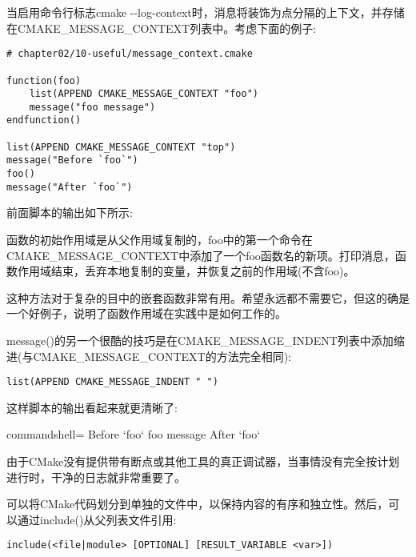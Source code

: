 当启用命令行标志cmake -{}-log-context时，消息将装饰为点分隔的上下文，并存储在CMAKE\_MESSAGE\_CONTEXT列表中。考虑下面的例子:

\begin{lstlisting}[style=styleCMake]
# chapter02/10-useful/message_context.cmake
	
function(foo)
	list(APPEND CMAKE_MESSAGE_CONTEXT "foo")
	message("foo message")
endfunction()

list(APPEND CMAKE_MESSAGE_CONTEXT "top")
message("Before `foo`")
foo()
message("After `foo`")
\end{lstlisting}

前面脚本的输出如下所示:


函数的初始作用域是从父作用域复制的，foo中的第一个命令在CMAKE\_MESSAGE\_CONTEXT中添加了一个foo函数名的新项。打印消息，函数作用域结束，丢弃本地复制的变量，并恢复之前的作用域(不含foo)。

这种方法对于复杂的目中的嵌套函数非常有用。希望永远都不需要它，但这的确是一个好例子，说明了函数作用域在实践中是如何工作的。

message()的另一个很酷的技巧是在CMAKE\_MESSAGE\_INDENT列表中添加缩进(与CMAKE\_MESSAGE\_CONTEXT的方法完全相同):

\begin{lstlisting}[style=styleCMake]
list(APPEND CMAKE_MESSAGE_INDENT " ")
\end{lstlisting}

这样脚本的输出看起来就更清晰了:

\begin{tcblisting}{commandshell={}}
Before `foo`
  foo message
After `foo`
\end{tcblisting}

由于CMake没有提供带有断点或其他工具的真正调试器，当事情没有完全按计划进行时，干净的日志就非常重要了。


可以将CMake代码划分到单独的文件中，以保持内容的有序和独立性。然后，可以通过include()从父列表文件引用:

\begin{lstlisting}[style=styleCMake]
include(<file|module> [OPTIONAL] [RESULT_VARIABLE <var>])
\end{lstlisting}


